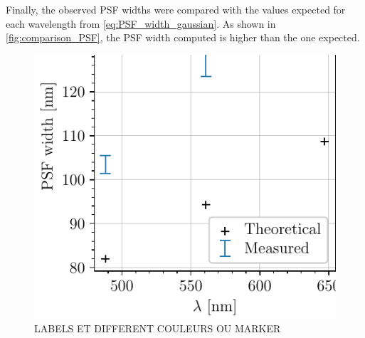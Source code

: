 Finally, the observed PSF widths were compared with the values expected for each wavelength from \autoref{eq:PSF_width_gaussian}.
As shown in \autoref{fig:comparison_PSF}, the PSF width computed is higher than the one expected.

\begin{figure}
    \centering
    \includegraphics[scale=1]{figures/comparison_PSF.pdf}
    \caption{LABELS ET DIFFERENT COULEURS OU MARKER}
    \label{fig:comparison_PSF}
\end{figure}

